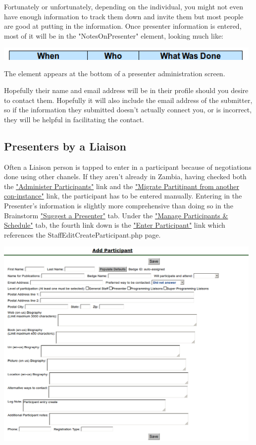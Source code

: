 \documentclass[captions=tablesignature]{scrartcl}
\begin{document}
Fortunately or unfortunately, depending on the individual, you
might not even have enough information to track them down and
invite them but most people are good at putting in the
information.  Once presenter information is entered, most of it
will be in the "NotesOnPresenter" element, looking much like:

\includegraphics[width=0.98\textwidth]{./Images/Notes_On_Participant.png}

The element appears at the bottom of a presenter administration
screen.

Hopefully their name and email address will be in their profile
should you desire to contact them.  Hopefully it will also include
the email address of the submitter, so if the information they
submitted doesn't actually connect you, or is incorrect, they will
be helpful in facilitating the contact.
\subsection{Presenters by a Liaison}
\label{sec-2-3}
Often a Liaison person is tapped to enter in a participant because
of negotiations done using other chanels.  If they aren't already
in Zambia, having checked both the \hyperref[sec-3]{"Administer Participants"} link
and the \hyperref[sec-2-1-2]{"Migrate Partitipant from another con-instance"} link, the
participant has to be entered manually.  Entering in the Presenter's
information is slightly more comprehensive than doing so in the
Brainstorm \hyperref[sec-2-2]{"Suggest a Presenter"} tab.  Under the \hyperref[sec-2]{"Manage
Participants \& Schedule"} tab, the fourth link down is the \hyperref[sec-2-3]{"Enter
Participant"} link which references the
StaffEditCreateParticipant.php page.

\includegraphics[width=0.98\textwidth]{./Images/Add_Participant.png}
\end{document}
